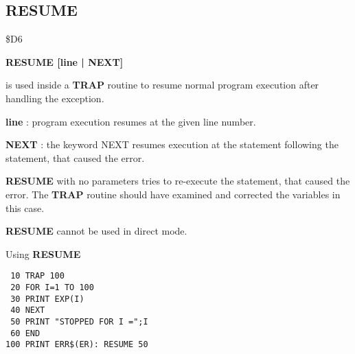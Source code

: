 \subsection{RESUME}
\begin{description}[leftmargin=2cm,style=nextline]
\item [Token:] \$D6
\item [Format:] {\bf RESUME [line | NEXT]}
\item [Usage:]  is used inside a {\bf TRAP} routine to
                resume normal program execution after
                handling the exception.

                {\bf line} : program execution resumes
                at the given line number.

                {\bf NEXT} : the keyword NEXT resumes
                execution at the statement following
                the statement, that caused the error.

                {\bf RESUME} with no parameters tries to
                re-execute the statement, that caused the error.
                The {\bf TRAP} routine should have examined
                and corrected the variables in this case.

\item [Remarks:] {\bf RESUME} cannot be used in direct mode.
\item [Example:] Using {\bf RESUME}

\begin{tcolorbox}[colback=black,coltext=white]
\verbatimfont{\codefont}
\begin{verbatim}
 10 TRAP 100
 20 FOR I=1 TO 100
 30 PRINT EXP(I)
 40 NEXT
 50 PRINT "STOPPED FOR I =";I
 60 END
100 PRINT ERR$(ER): RESUME 50
\end{verbatim}
\end{tcolorbox}
\end{description}


\newpage
